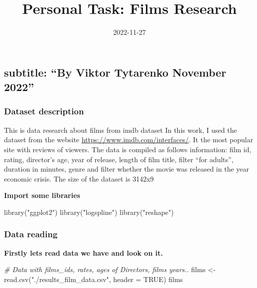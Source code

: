 \documentclass[
]{article}
\title{Personal Task: Films Research}
\author{}
\date{\vspace{-2.5em}2022-11-27}
\newenvironment{Shaded}{\begin{snugshade}}{\end{snugshade}}
\newcommand{\AttributeTok}[1]{\textcolor[rgb]{0.77,0.63,0.00}{#1}}
\newcommand{\CommentTok}[1]{\textcolor[rgb]{0.56,0.35,0.01}{\textit{#1}}}
\newcommand{\ConstantTok}[1]{\textcolor[rgb]{0.00,0.00,0.00}{#1}}
\newcommand{\FunctionTok}[1]{\textcolor[rgb]{0.00,0.00,0.00}{#1}}
\newcommand{\NormalTok}[1]{#1}
\newcommand{\OtherTok}[1]{\textcolor[rgb]{0.56,0.35,0.01}{#1}}
\newcommand{\StringTok}[1]{\textcolor[rgb]{0.31,0.60,0.02}{#1}}
\begin{document}
\maketitle

\hypertarget{subtitle-by-viktor-tytarenko-november-2022}{%
\subsection{\texorpdfstring{subtitle: ``By Viktor Tytarenko
\textbf{November
2022}''}{subtitle: ``By Viktor Tytarenko November 2022''}}\label{subtitle-by-viktor-tytarenko-november-2022}}

\hypertarget{dataset-description}{%
\subsubsection{Dataset description}\label{dataset-description}}

This is data research about films from imdb dataset In this work, I used
the dataset from the website \url{https://www.imdb.com/interfaces/}. It
the most popular site with reviews of viewers. The data is compiled as
follows information: film id, rating, director's age, year of release,
length of film title, filter ``for adults'', duration in minutes, genre
and filter whether the movie was released in the year economic crisis.
The size of the dataset is 3142x9

\textbf{Import some libraries}

\begin{Shaded}
\begin{Highlighting}[]
\FunctionTok{library}\NormalTok{(}\StringTok{"ggplot2"}\NormalTok{) }
\FunctionTok{library}\NormalTok{(}\StringTok{"logspline"}\NormalTok{)}
\FunctionTok{library}\NormalTok{(}\StringTok{"reshape"}\NormalTok{)}
\end{Highlighting}
\end{Shaded}

\hypertarget{data-reading}{%
\subsubsection{Data reading}\label{data-reading}}

\textbf{Firstly lets read data we have and look on it.}

\begin{Shaded}
\begin{Highlighting}[]
\CommentTok{\# Data with films\_ids, rates, ages of Directors, films years..}
\NormalTok{films }\OtherTok{\textless{}{-}} \FunctionTok{read.csv}\NormalTok{(}\StringTok{"./results\_film\_data.csv"}\NormalTok{, }\AttributeTok{header =} \ConstantTok{TRUE}\NormalTok{)}
\NormalTok{films}
\end{Highlighting}
\end{Shaded}
\end{document}

